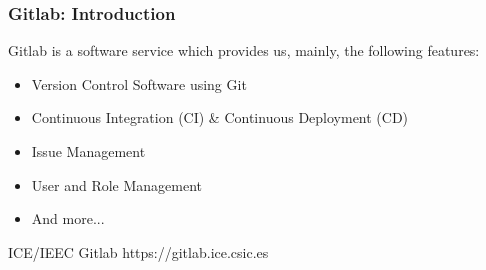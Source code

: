 \begin{frame}

\frametitle{Gitlab: Introduction}


Gitlab is a software service which provides us, mainly, the following features:
\begin{itemize}
\item Version Control Software using Git
\item Continuous Integration (CI) \& Continuous Deployment (CD)
\item Issue Management
\item User and Role Management
\item And more...
\end{itemize}


\pause

\begin{block}{ICE/IEEC Gitlab}
https://gitlab.ice.csic.es
\end{block}

\end{frame}